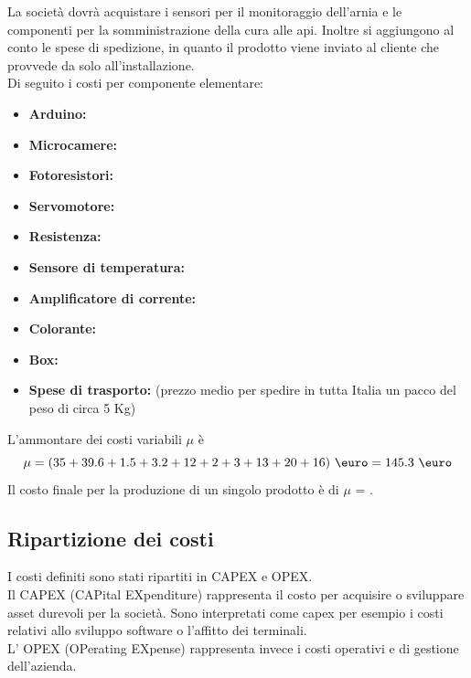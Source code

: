 La società dovrà acquistare i sensori per il monitoraggio dell’arnia e le
componenti per la somministrazione della cura alle api. Inoltre si aggiungono al
conto le spese di spedizione, in quanto il prodotto viene inviato al cliente che
provvede da solo all’installazione.\\
%
Di seguito i costi per componente elementare:
\begin{itemize}
\item \textbf{Arduino: }
\item \textbf{Microcamere: }
\item \textbf{Fotoresistori: }
\item \textbf{Servomotore: }
\item \textbf{Resistenza: }
\item \textbf{Sensore di temperatura: }
\item \textbf{Amplificatore di corrente: }
\item \textbf{Colorante: }
\item \textbf{Box: }
\item \textbf{Spese di trasporto: } (prezzo medio per spedire in tutta
Italia un pacco del peso di circa 5 Kg)
\end{itemize}
L’ammontare dei costi variabili $\mu$ è
\begin{displaymath}
\mu= (35 + 39.6 + 1.5 + 3.2 + 12 + 2 + 3 + 13  + 20 + 16) \ \mbox{\euro} = 145.3
\ \mbox{\euro}
\end{displaymath}
Il costo finale per la produzione di un singolo prodotto è di $\mu$ = .
\subsection{Ripartizione dei costi}
I costi definiti sono stati ripartiti in CAPEX e OPEX.\\
Il CAPEX (CAPital EXpenditure) rappresenta il costo per acquisire o sviluppare
asset durevoli per la società. Sono interpretati come capex per esempio i costi
relativi allo sviluppo software o l’affitto dei terminali.\\
L’ OPEX (OPerating EXpense) rappresenta invece i costi operativi e di gestione
dell’azienda.

